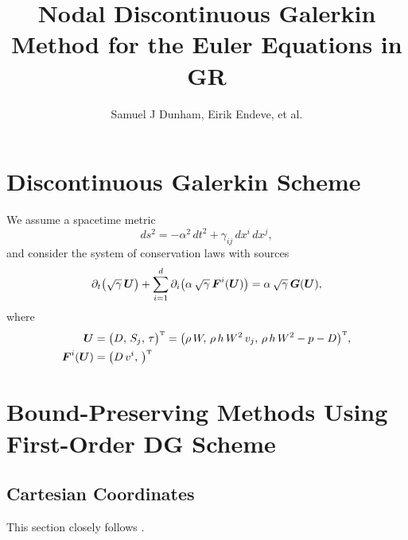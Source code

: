 \documentclass[10pt,preprint]{aastex}
\begin{document}
\title{Nodal Discontinuous Galerkin Method for the Euler Equations in GR}
\author{Samuel J Dunham, Eirik Endeve, et al.}

\tableofcontents

\section{Discontinuous Galerkin Scheme}
\label{sec:dgMethod}

We assume a spacetime metric
\begin{equation}
  ds^{2}=-\alpha^{2}\,dt^{2}+\gamma_{ij}\,dx^{i}\,dx^{j},
\end{equation}
and consider the system of conservation laws with sources
\begin{equation}
  \partial_{t}{}\big(\sqrt{\gamma}\,\boldsymbol{U}\big)+\sum_{i=1}^{d}\partial_{i}{}\big(\alpha\,\sqrt{\gamma}\,\boldsymbol{F}^{i}(\boldsymbol{U})\big)=\alpha\,\sqrt{\gamma}\,\boldsymbol{G}(\boldsymbol{U}),
  \label{eq:conservationLaws}
\end{equation}
where
\begin{align}
  \boldsymbol{U}
  &=\big(D,\,S_{j},\,\tau\big)^{\mbox{\tiny T}}
  =\big(\rho\,W,\,\rho\,h\,W^{2}\,v_{j},\,\rho\,h\,W^{2}-p-D\big)^{\mbox{\tiny T}}, \\
  \boldsymbol{F}^{i}(\boldsymbol{U})
  &=\big(D\,v^{i},\,\big)^{\mbox{\tiny T}}
\end{align}


\section{Bound-Preserving Methods Using First-Order DG Scheme}

\subsection{Cartesian Coordinates}
This section closely follows \citet{Qin2016}.
\end{document}
